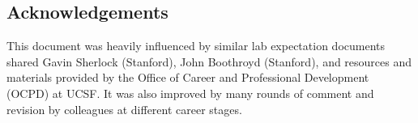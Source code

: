 \documentclass[10pt, letterpaper, twocolumn]{article} %
\begin{document}
\subsection{Acknowledgements}
This document was heavily influenced by similar lab expectation documents shared Gavin Sherlock (Stanford), John Boothroyd (Stanford), and resources and materials provided by the Office of Career and Professional Development (OCPD) at UCSF. It was also improved by many rounds of comment and revision by colleagues at different career stages.

\printbibliography[title={Bibliography}] %

\end{document}
